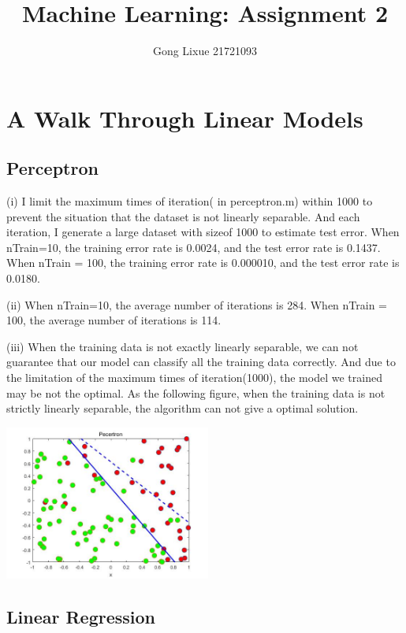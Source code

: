 \documentclass[11pt]{article} %
\title{Machine Learning: Assignment 2}
\author{Gong Lixue 21721093}
\begin{document}
\maketitle

\section{A Walk Through Linear Models}

\subsection{Perceptron}

(i) I limit the maximum times of iteration( in perceptron.m) within 1000 to prevent the situation that the dataset is not linearly separable. And each iteration, I generate a large dataset with sizeof 1000 to estimate test error.
When nTrain=10, the training error rate is 0.0024, and the test error rate is 0.1437. 
When nTrain = 100, the training error rate is 0.000010, and the test error rate is 0.0180. 

(ii) When nTrain=10, the average number of iterations is 284.
When nTrain = 100, the average number of iterations is 114.

(iii) When the training data is not exactly linearly separable, we can not guarantee that our model can classify all the training data correctly. And due to the limitation of the maximum times of iteration(1000), the model we trained may be not the optimal. As the following figure, when the training data is not strictly linearly separable, the algorithm can not give a optimal solution.

\begin{center}
\includegraphics[height=2in]{./Perceptron_nonlinear.jpg}
\end{center}




\subsection{Linear Regression}
\end{document}

